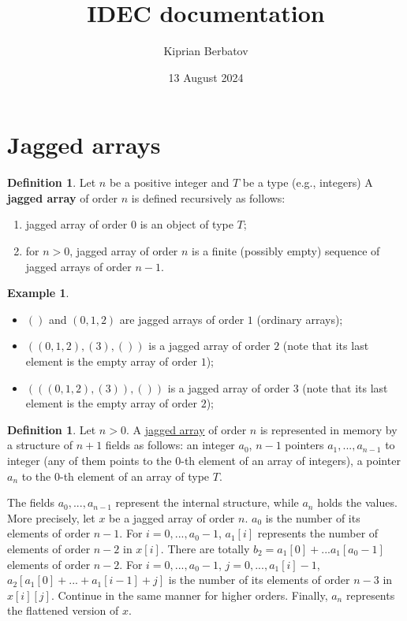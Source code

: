 \documentclass[fleqn]{article}
\title{IDEC documentation}
\author{Kiprian Berbatov}
\date{13 August 2024}
\theoremstyle{definition}
\newtheorem{definition}[theorem]{Definition}
\newtheorem{example}[theorem]{Example}
\begin{document}
\maketitle

\section{Jagged arrays}

\begin{definition}
  \label{idec:jagged:definition}
  Let $n$ be a positive integer and $T$ be a type (e.g., integers)
  A \textbf{jagged array}
  of order $n$ is defined recursively as follows:
  \begin{enumerate}
    \item
      jagged array of order $0$ is an object of type $T$;
    \item
      for $n > 0$, jagged array of order $n$ is a finite (possibly empty)
      sequence of jagged arrays of order $n - 1$.
  \end{enumerate}
\end{definition}

\begin{example}
  \leavevmode
  \begin{itemize}
    \item
      $()$ and $(0, 1, 2)$ are jagged arrays of order $1$ (ordinary arrays);
    \item
      $((0, 1, 2), (3), ())$ is a jagged array of order $2$
      (note that its last element is the empty array of order $1$);
    \item
      $(((0, 1, 2), (3)),())$ is a jagged array of order $3$
      (note that its last element is the empty array of order $2$);
  \end{itemize}
\end{example}

\begin{definition}
  Let $n > 0$.
  A \hyperref[idec:jagged:definition]{jagged array}
  of order $n$ is represented in memory by a structure of $n + 1$
  fields as follows:
  an integer $a_0$,
  $n - 1$ pointers $a_1, ..., a_{n - 1}$ to integer
  (any of them points to the  $0$-th element of an array of integers),
  a pointer $a_n$ to the $0$-th element of an array of type $T$.

  The fields $a_0, ..., a_{n - 1}$ represent the internal structure,
  while $a_n$ holds the values.
  More precisely, let $x$ be a jagged array of order $n$.
  $a_0$ is the number of its elements of order $n - 1$.
  For $i = 0, ..., a_0 - 1$,
  $a_1[i]$ represents the number of elements of order $n - 2$ in $x[i]$.
  There are totally $b_2 = a_1[0] + ... a_1[a_0 - 1]$ elements of order $n - 2$.
  For $i = 0, ..., a_0 - 1$, $j  = 0, ..., a_1[i] - 1$,
  $a_2[a_1[0] + ... + a_1[i - 1] + j]$
  is the number of its elements of order $n - 3$ in $x[i][j]$.
  Continue in the same manner for higher orders.
  Finally, $a_n$ represents the flattened version of $x$.
\end{definition}
\end{document}
